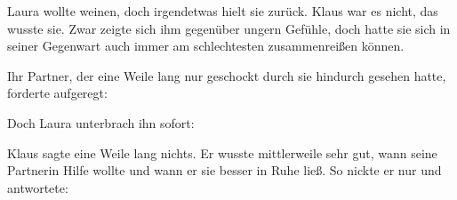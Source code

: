Laura wollte weinen, doch irgendetwas hielt sie zurück. Klaus war es nicht, das wusste sie. Zwar zeigte sich ihm gegenüber ungern Gefühle, doch hatte sie sich in seiner Gegenwart auch immer am schlechtesten zusammenreißen können.

\par

Ihr Partner, der eine Weile lang nur geschockt durch sie hindurch gesehen hatte, forderte aufgeregt: 

\par

Doch Laura unterbrach ihn sofort: 

\par

Klaus sagte eine Weile lang nichts. Er wusste mittlerweile sehr gut, wann seine Partnerin Hilfe wollte und wann er sie besser in Ruhe ließ. So nickte er nur und antwortete: 